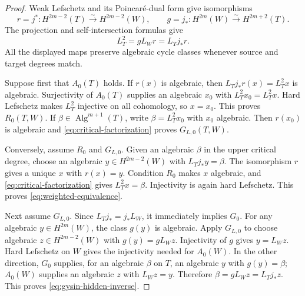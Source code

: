 \begin{proof}
Weak Lefschetz and its Poincar\'e-dual form give isomorphisms
\[
 r=j^*:H^{2m-2}(T)\xrightarrow{\sim}H^{2m-2}(W),\qquad
 g=j_*:H^{2m}(W)\xrightarrow{\sim}H^{2m+2}(T).
\]
The projection and self-intersection formulas give
\begin{equation}
 L_T^2=gL_Wr=L_Tj_*r.
 \label{eq:critical-factorization}
\end{equation}
All the displayed maps preserve algebraic cycle classes whenever
source and target degrees match.

Suppose first that $A_0(T)$ holds.  If $r(x)$ is algebraic, then
$L_Tj_*r(x)=L_T^2x$ is algebraic.  Surjectivity of $A_0(T)$ supplies
an algebraic $x_0$ with $L_T^2x_0=L_T^2x$.  Hard Lefschetz makes
$L_T^2$ injective on all cohomology, so $x=x_0$.  This proves
$R_0(T,W)$.  If $\beta\in\operatorname{Alg}^{m+1}(T)$, write
$\beta=L_T^2x_0$ with $x_0$ algebraic.  Then $r(x_0)$ is algebraic
and \eqref{eq:critical-factorization} proves $G_{L,0}(T,W)$.

Conversely, assume $R_0$ and $G_{L,0}$.  Given an algebraic
$\beta$ in the upper critical degree, choose an algebraic
$y\in H^{2m-2}(W)$ with $L_Tj_*y=\beta$.  The isomorphism $r$
gives a unique $x$ with $r(x)=y$.  Condition $R_0$ makes $x$
algebraic, and \eqref{eq:critical-factorization} gives
$L_T^2x=\beta$.  Injectivity is again hard Lefschetz.  This proves
\eqref{eq:weighted-equivalence}.

Next assume $G_{L,0}$.  Since $L_Tj_*=j_*L_W$, it immediately
implies $G_0$.  For any algebraic $y\in H^{2m}(W)$, the class
$g(y)$ is algebraic.  Apply $G_{L,0}$ to choose algebraic
$z\in H^{2m-2}(W)$ with $g(y)=gL_Wz$.  Injectivity of $g$ gives
$y=L_Wz$.  Hard Lefschetz on $W$ gives the injectivity needed for
$A_0(W)$.  In the other direction, $G_0$ supplies, for an algebraic
$\beta$ on $T$, an algebraic $y$ with $g(y)=\beta$; $A_0(W)$
supplies an algebraic $z$ with $L_Wz=y$.  Therefore
$\beta=gL_Wz=L_Tj_*z$.  This proves
\eqref{eq:gysin-hidden-inverse}.
\end{proof}

